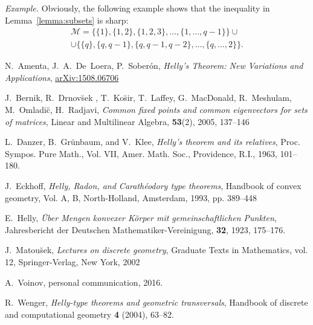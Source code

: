 \documentclass[12pt,nopagetitle]{article}
\theoremstyle{plain}
\theoremstyle{definition}
\begin{document}
\emph{Example.} Obviously, the following example shows that the inequality in Lemma~\ref{lemma:subsets} is sharp:
\begin{gather*}
\mathcal{M}=\{\{1\},\{1,2\}, \{1,2,3\},\dots,\{1,\dots, q-1\}\}\cup \\
\cup\{\{q\},\{q,q-1\},\{q,q-1,q-2\}, \dots,\{q,\dots,2\}\}.
\end{gather*}


	\begin{thebibliography}{111}
 N.~Amenta, J.~A.~De~Loera, P.~Sober\'on, \emph{Helly's Theorem: New Variations and Applications}, \href{https://arxiv.org/abs/1508.07606}{arXiv:1508.06706}

 J.~Bernik, R.~Drnov\u{s}ek , T.~Ko\u{s}ir, T.~Laffey, G.~MacDonald, R.~Meshulam, M.~Omladi\u{c}, H.~Radjavi, \emph{Common fixed points and common eigenvectors for sets of matrices}, Linear and Multilinear Algebra, \textbf{53}(2), 2005, 137--146

 L.~Danzer, B.~Gr\"unbaum, and V.~Klee, \emph{Helly's theorem and its relatives}, Proc.
Sympos. Pure Math., Vol. VII, Amer. Math. Soc., Providence, R.I., 1963, 101--180.

 J.~Eckhoff, \emph{Helly, Radon, and Carath\'eodory type theorems}, Handbook of convex
geometry, Vol. A, B, North-Holland, Amsterdam, 1993, pp. 389–448

 E.~Helly, \emph{\" Uber Mengen konvexer K\"orper mit gemeinschaftlichen Punkten}, Jahresbericht der Deutschen Mathematiker-Vereinigung, {\bf 32}, 1923,  175--176.

 J.~Matou\u{s}ek, \emph{Lectures on discrete geometry}, Graduate Texts in Mathematics, vol. 12, Springer-Verlag, New York, 2002

 A.~Voinov, personal communication, 2016.

 R.~Wenger, \emph{Helly-type theorems and geometric transversals}, Handbook of discrete and computational geometry {\bf 4} (2004), 63–82.
	\end{thebibliography}
\end{document}
